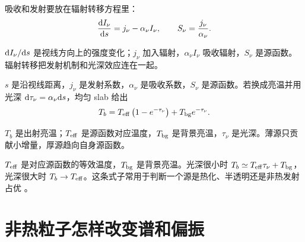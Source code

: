 吸收和发射要放在辐射转移方程里：
\begin{equation}
  \frac{{\rm d}I_\nu}{{\rm d}s}=j_\nu-\alpha_\nu I_\nu,
  \qquad
  S_\nu=\frac{j_\nu}{\alpha_\nu}.
  \label{eq:ch09-radiative-transfer}
\end{equation}
\begin{formulaexplain}
\({\rm d}I_\nu/{\rm d}s\) 是视线方向上的强度变化；\(j_\nu\) 加入辐射，\(\alpha_\nu I_\nu\) 吸收辐射，\(S_\nu\) 是源函数。辐射转移把发射机制和光深效应连在一起。
\end{formulaexplain}
\(s\) 是沿视线距离，\(j_\nu\) 是发射系数，\(\alpha_\nu\) 是吸收系数，\(S_\nu\) 是源函数。若换成亮温并用光深 \({\rm d}\tau_\nu=\alpha_\nu{\rm d}s\)，均匀 slab 给出
\begin{equation}
  T_b=T_{\rm eff}\left(1-e^{-\tau_\nu}\right)
      +T_{\rm bg}e^{-\tau_\nu}.
  \label{eq:ch09-tb-transfer}
\end{equation}
\begin{formulaexplain}
\(T_b\) 是出射亮温；\(T_{\rm eff}\) 是源函数对应温度，\(T_{\rm bg}\) 是背景亮温，\(\tau_\nu\) 是光深。薄源只贡献小增量，厚源趋向自身源函数。
\end{formulaexplain}
\(T_{\rm eff}\) 是对应源函数的等效温度，\(T_{\rm bg}\) 是背景亮温。光深很小时 \(T_b\simeq T_{\rm eff}\tau_\nu+T_{\rm bg}\)，光深很大时 \(T_b\to T_{\rm eff}\)。这条式子常用于判断一个源是热化、半透明还是非热发射占优 \citep{1979rpa..book.....R,2011piim.book.....D,1985ARA&A..23..169D}。

\section{非热粒子怎样改变谱和偏振}

